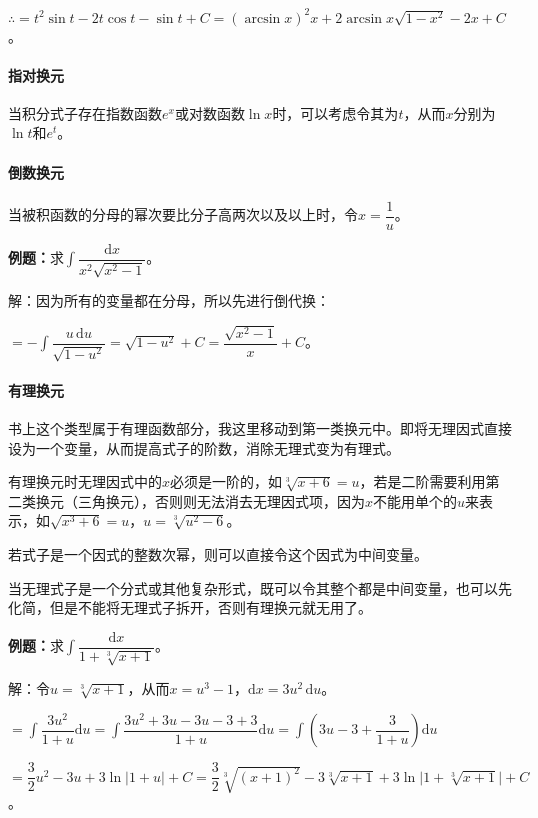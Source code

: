 \documentclass[UTF8, 12pt]{ctexart}
\begin{document}
$\therefore=t^2\sin t-2t\cos t-\sin t+C=(\arcsin x)^2x+2\arcsin x\sqrt{1-x^2}-2x+C$。

\paragraph{指对换元} \leavevmode \medskip

当积分式子存在指数函数$e^x$或对数函数$\ln x$时，可以考虑令其为$t$，从而$x$分别为$\ln t$和$e^t$。

\paragraph{倒数换元} \leavevmode \medskip

当被积函数的分母的幂次要比分子高两次以及以上时，令$x=\dfrac{1}{u}$。

\textbf{例题：}求$\displaystyle{\int\dfrac{\textrm{d}x}{x^2\sqrt{x^2-1}}}$。\medskip

解：因为所有的变量都在分母，所以先进行倒代换：

$=-\displaystyle{\int\dfrac{u\,\textrm{d}u}{\sqrt{1-u^2}}}=\sqrt{1-u^2}+C=\dfrac{\sqrt{x^2-1}}{x}+C$。

\paragraph{有理换元} \leavevmode \medskip

书上这个类型属于有理函数部分，我这里移动到第一类换元中。即将无理因式直接设为一个变量，从而提高式子的阶数，消除无理式变为有理式。

有理换元时无理因式中的$x$必须是一阶的，如$\sqrt[3]{x+6}=u$，若是二阶需要利用第二类换元（三角换元），否则则无法消去无理因式项，因为$x$不能用单个的$u$来表示，如$\sqrt{x^3+6}=u$，$u=\sqrt[3]{u^2-6}$。

若式子是一个因式的整数次幂，则可以直接令这个因式为中间变量。

当无理式子是一个分式或其他复杂形式，既可以令其整个都是中间变量，也可以先化简，但是不能将无理式子拆开，否则有理换元就无用了。

\textbf{例题：}求$\displaystyle{\int\dfrac{\textrm{d}x}{1+\sqrt[3]{x+1}}}$。

解：令$u=\sqrt[3]{x+1}$，从而$x=u^3-1$，$\textrm{d}x=3u^2\,\textrm{d}u$。

$=\displaystyle{\int\dfrac{3u^2}{1+u}\textrm{d}u=\int\dfrac{3u^2+3u-3u-3+3}{1+u}\textrm{d}u=\int\left(3u-3+\dfrac{3}{1+u}\right)\textrm{d}u}$

$=\dfrac{3}{2}u^2-3u+3\ln\vert1+u\vert+C=\dfrac{3}{2}\sqrt[3]{(x+1)^2}-3\sqrt[3]{x+1}+3\ln\vert1+\sqrt[3]{x+1}\vert+C$。
\end{document}
